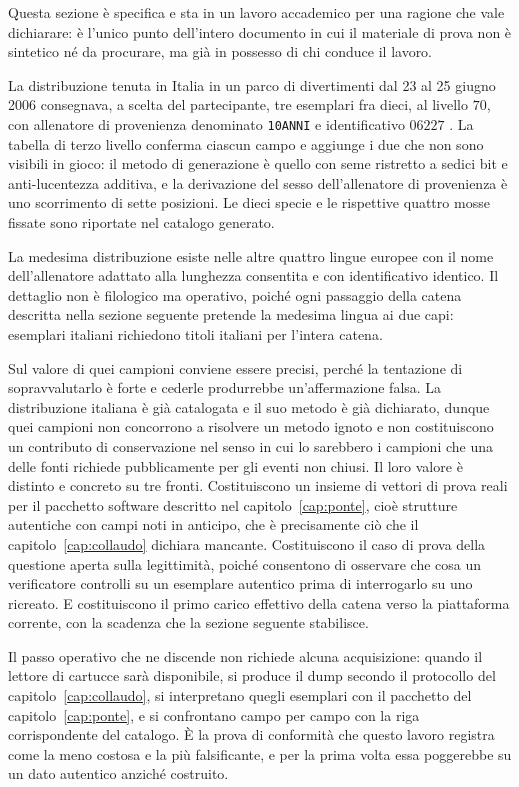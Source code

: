 Questa sezione è specifica e sta in un lavoro accademico per una ragione che vale dichiarare: è l'unico punto dell'intero documento in cui il materiale di prova non è sintetico né da procurare, ma già in possesso di chi conduce il lavoro.

La distribuzione tenuta in Italia in un parco di divertimenti dal 23 al 25 giugno 2006 consegnava, a scelta del partecipante, tre esemplari fra dieci, al livello $70$, con allenatore di provenienza denominato \texttt{10ANNI} e identificativo $06227$ \cite{bulbapedia-eventi-italia}. La tabella di terzo livello conferma ciascun campo e aggiunge i due che non sono visibili in gioco: il metodo di generazione è quello con seme ristretto a sedici bit e anti-lucentezza additiva, e la derivazione del sesso dell'allenatore di provenienza è uno scorrimento di sette posizioni. Le dieci specie e le rispettive quattro mosse fissate sono riportate nel catalogo generato.

La medesima distribuzione esiste nelle altre quattro lingue europee con il nome dell'allenatore adattato alla lunghezza consentita e con identificativo identico. Il dettaglio non è filologico ma operativo, poiché ogni passaggio della catena descritta nella sezione seguente pretende la medesima lingua ai due capi: esemplari italiani richiedono titoli italiani per l'intera catena.

Sul valore di quei campioni conviene essere precisi, perché la tentazione di sopravvalutarlo è forte e cederle produrrebbe un'affermazione falsa. La distribuzione italiana è già catalogata e il suo metodo è già dichiarato, dunque quei campioni non concorrono a risolvere un metodo ignoto e non costituiscono un contributo di conservazione nel senso in cui lo sarebbero i campioni che una delle fonti richiede pubblicamente per gli eventi non chiusi. Il loro valore è distinto e concreto su tre fronti. Costituiscono un insieme di vettori di prova reali per il pacchetto software descritto nel capitolo~\ref{cap:ponte}, cioè strutture autentiche con campi noti in anticipo, che è precisamente ciò che il capitolo~\ref{cap:collaudo} dichiara mancante. Costituiscono il caso di prova della questione aperta sulla legittimità, poiché consentono di osservare che cosa un verificatore controlli su un esemplare autentico prima di interrogarlo su uno ricreato. E costituiscono il primo carico effettivo della catena verso la piattaforma corrente, con la scadenza che la sezione seguente stabilisce.

Il passo operativo che ne discende non richiede alcuna acquisizione: quando il lettore di cartucce sarà disponibile, si produce il dump secondo il protocollo del capitolo~\ref{cap:collaudo}, si interpretano quegli esemplari con il pacchetto del capitolo~\ref{cap:ponte}, e si confrontano campo per campo con la riga corrispondente del catalogo. È la prova di conformità che questo lavoro registra come la meno costosa e la più falsificante, e per la prima volta essa poggerebbe su un dato autentico anziché costruito.

